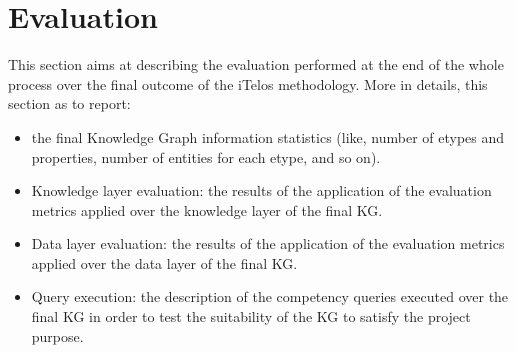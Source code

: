 \section{Evaluation}

This section aims at describing the evaluation performed at the end of the whole process over the final outcome of the iTelos methodology. More in details, this section as to report:

\begin{itemize}
    \item the final Knowledge Graph information statistics (like, number of etypes and properties, number of entities for each etype, and so on).
    \item Knowledge layer evaluation: the results of the application of the evaluation metrics applied over the knowledge layer of the final KG.
    \item Data layer evaluation: the results of the application of the evaluation metrics applied over the data layer of the final KG.
    \item Query execution: the description of the competency queries executed over the final KG in order to test the suitability of the KG to satisfy the project purpose. 
\end{itemize}

